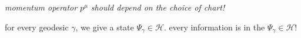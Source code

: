 \documentclass[12pt]{article}
\theoremstyle{definition}
\theoremstyle{plain}
\begin{document}
\textit{momentum operator $p^\mu$ should depend on the choice of chart!}



for every geodesic $\gamma$, we give a state $\Psi_\gamma\in \mathcal H$. every information is in the $\Psi_\gamma\in \mathcal H$!
\end{document}
